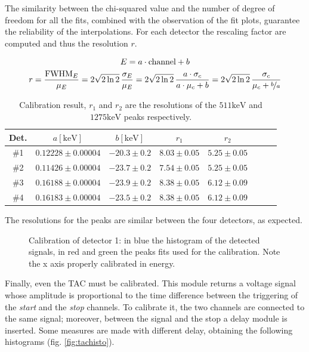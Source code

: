 \documentclass[11pt,a4 paper]{article}
\let\oldfrac\frac
\renewcommand{\frac}[3][d]{\ifthenelse{\equal{#1}{d}}{\oldfrac{#2}{#3}}{\nicefrac{#2}{#3}}}
\begin{document}
The similarity between the chi-squared value and the number of degree of freedom for all the fits, combined with the observation of the fit plots, guarantee the reliability of the interpolations. For each detector the rescaling factor are computed and thus the resolution $r$.

\begin{gather*}
    E = a \cdot \text{channel} + b \\
    r = \frac{\text{FWHM}_E}{\mu_E} = 2\sqrt{2\ln2} \,\frac{\sigma_E}{\mu_E} = 2\sqrt{2\ln2}\, \frac{a \cdot \sigma_c}{a \cdot \mu_c + b} = 2\sqrt{2\ln2} \,\frac{\sigma_c}{\mu_c + \frac[f]{b}{a}}
\end{gather*}

\begin{table}[H]
    \centering
    \begin{tabular}{cccccccc}
        \toprule
        Det. & $a [\si{\kilo\electronvolt}]$ & $b [\si{\kilo\electronvolt}]$ & $r_1$ & $r_2$ \\
        \midrule
        \#1 & $0.12228\pm0.00004$ & $-20.3\pm0.2$ & $8.03\pm0.05$ & $5.25\pm0.05$ \\
        \#2 & $0.11426\pm0.00004$ & $-23.7\pm0.2$ & $7.54\pm0.05$ & $5.25\pm0.05$ \\
        \#3 & $0.16188\pm0.00004$ & $-23.9\pm0.2$ & $8.38\pm0.05$ & $6.12\pm0.09$ \\
        \#4 & $0.16183\pm0.00004$ & $-23.5\pm0.2$ & $8.38\pm0.05$ & $6.12\pm0.09$ \\
        \bottomrule
    \end{tabular}
    \caption{Calibration result, $r_1$ and $r_2$ are the resolutions of the $511\si{\kilo\electronvolt}$ and $1275\si{\kilo\electronvolt}$ peaks respectively.}
    \label{tab:calib2}
\end{table}
The resolutions for the peaks are similar between the four detectors, as expected.

\begin{figure}[H]
    \centering
    \caption{Calibration of detector 1: in blue the histogram of the detected signals, in red and green the peaks fits used for the calibration. Note the x axis properly calibrated in energy.}
    \label{fig:det1_calibr}
\end{figure}


Finally, even the TAC must be calibrated. This module returns a voltage signal whose amplitude is proportional to the time difference between the triggering of the \emph{start} and the \emph{stop} channels. To calibrate it, the two channels are connected to the same signal; moreover, between the signal and the stop a delay module is inserted. Some measures are made with different delay, obtaining the following histograms (fig. \ref{fig:tachisto}).
\end{document}

